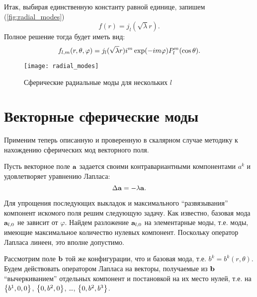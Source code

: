 \documentclass[12pt,a4paper]{article}
\begin{document}
        Итак, выбирая единственную константу равной единице, запишем (\autoref{fig:radial_modes})
        \begin{equation}
            f(r) = j_l(\sqrt{\lambda} r) .
        \end{equation}
        Полное решение тогда будет иметь вид:
        \begin{equation}
            f_{l,m}(r,\theta,\varphi)
                = j_l(\sqrt{\lambda} r) i^m \exp(- i m \varphi) P^m_l\qty(\cos\theta) .
        \end{equation}
        \begin{figure}[h]
            \centering
            \texttt{[image: radial\_modes]}
            \caption[]{Сферические радиальные моды для нескольких $l$}
            \label{fig:radial_modes}
        \end{figure}


    \section{Векторные сферические моды}

        Применим теперь описанную и проверенную в скалярном случае методику к нахождению сферических мод векторного поля.

        Пусть векторное поле $\vb{a}$ задается своими контравариантными компонентами $a^k$ и удовлетворяет уравнению Лапласа:
        \begin{equation}\label{eq:laplacian_sturm_liouville}
            \Delta \vb{a} = - \lambda \vb{a} .
        \end{equation}

        Для упрощения последующих выкладок и максимального \enquote{развязывания} компонент искомого поля решим следующую задачу. Как известно, базовая мода $\vb{a}_{l,0}$ не зависит от $\varphi$. Найдем разложение $\vb{a}_{l,0}$ на элементарные моды, т.е. моды, имеющие максимальное количество нулевых компонент. Поскольку оператор Лапласа линеен, это вполне допустимо.

        Рассмотрим поле $\vb{b}$ той же конфигурации, что и базовая мода, т.е. $b^k = b^k(r,\theta)$. Будем действовать оператором Лапласа на векторы, получаемые из $\vb{b}$ \enquote{вычеркиванием} отдельных компонент и постановкой на их место нулей, т.е. на $\qty{ b^1, 0, 0 }$, $\qty{ 0, b^2, 0 }$, \dots, $\qty{ 0, b^2, b^3 }$.
\end{document}
